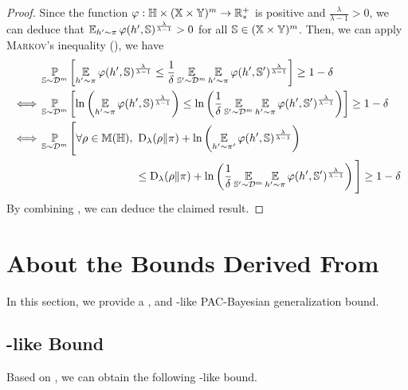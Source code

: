 \begin{noaddcontents}
\begin{proof}
Since the function $\varphi:\mathbb{H}\times(\mathbb{X}\times\mathbb{Y})^m \to \mathbb{R}^{+}_{*}$ is positive and $\frac{\lambda}{\lambda-1}>0$, we can deduce that $\operatorname*{\mathbb{E}}_{h'\sim\pi}\varphi(h', \mathbb{S})^{\frac{\lambda}{\lambda{-}1}}>0$ for all $\mathbb{S}\in(\mathbb{X}\times\mathbb{Y})^m$.
Then, we can apply \textsc{Markov}'s inequality (), we have
\begin{align}
    &\PP_{\S\sim\D^\m}\LB\EE_{\h'\sim\P}\varphi(\h', \S)^{\frac{\lambda}{\lambda-1}} \le \frac{1}{\delta}\EE_{\S'\sim\D^\m}\EE_{\h'\sim\P}\varphi(\h', \S')^{\frac{\lambda}{\lambda-1}}\RB\ge 1-\delta\nonumber\\
    \iff &\PP_{\S\sim\D^\m}\LB\ln\LP\EE_{\h'\sim\P}\varphi(\h', \S)^{\frac{\lambda}{\lambda-1}}\RP \le \ln\LP\frac{1}{\delta}\EE_{\S'\sim\D^\m}\EE_{\h'\sim\P}\varphi(\h', \S')^{\frac{\lambda}{\lambda-1}}\RP\RB\ge 1-\delta\nonumber\\
    \iff &\PP_{\S\sim\D^\m}\Bigg[\forall\Q\in\M(\H),\  \Renyi_{\lambda}(\Q\|\P)+\ln\LP\EE_{\h'\sim\P'}\varphi(\h', \S)^{\frac{\lambda}{\lambda-1}}\RP\nonumber\\
    &\hspace{3cm}\le \Renyi_{\lambda}(\Q\|\P)+\ln\LP\frac{1}{\delta}\EE_{\S'\sim\D^\m}\EE_{\h'\sim\P}\varphi(\h', \S')^{\frac{\lambda}{\lambda-1}}\RP\Bigg]\ge 1-\delta\label{chap:pac-bayes:eq:proof-general-begin-3}
\end{align}
By combining , we can deduce the claimed result.
\end{proof}

\section{About the Bounds Derived From }
\label{ap:pac-bayes:sec:corollary-begin}

In this section, we provide a \citeauthor{Seeger2002}, \citeauthor{McAllester2003} and \citeauthor{Catoni2007}-like PAC-Bayesian generalization bound.

\subsection{\citeauthor{McAllester2003}-like Bound}
\label{ap:pac-bayes:sec:proof-mcallester-begin}

Based on , we can obtain the following \citeauthor{McAllester2003}-like bound.


\end{noaddcontents}
